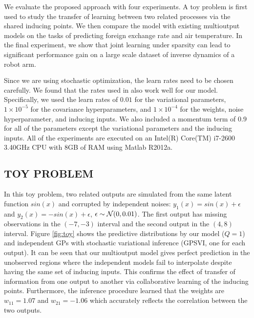 We evaluate the proposed approach with four experiments.
A toy problem is first used to study the transfer of learning between two related processes via the shared inducing points.
We then compare the model with existing multioutput models on the tasks of predicting foreign exchange rate and air temperature.
In the final experiment, we show that joint learning under sparsity can lead to significant performance gain on a large scale dataset of inverse dynamics of a robot arm. 

Since we are using stochastic optimization, the learn rates need to be chosen carefully.
We found that the rates used in \citet{hensmangaussian} also work well for our model.
Specifically, we used the learn rates of $0.01$ for the variational parameters, $1 \times 10^{-5}$ for the  covariance hyperparameters, and $1 \times 10^{-4}$ for the weights, noise hyperparameter, and inducing inputs.
We also included a momentum term of $0.9$ for all of the parameters except the variational parameters and the inducing inputs.
All of the experiments are executed on an Intel(R) Core(TM) i7-2600 3.40GHz CPU with 8GB of RAM using Matlab R2012a.

\subsection{TOY PROBLEM}
In this toy problem, two related outputs are simulated from the same latent function $sin(x)$ and corrupted by independent noises: $y_1(x) = sin(x) + \epsilon$ and $y_2(x) = -sin(x) + \epsilon$, $\epsilon \sim \mathcal{N}(0,0.01)$.
The first output has missing observations in the $(-7,-3)$ interval and the second output in the $(4,8)$ interval.
Figure \ref{fig:toy} shows the predictive distributions by our model ($Q = 1$) and independent GPs with stochastic variational inference (GPSVI, one for each output).
It can be seen that our multioutput model gives perfect prediction in the unobserved regions where the independent models fail to interpolate despite having the same set of inducing inputs.
This confirms the effect of transfer of information from one output to another via collaborative learning of the inducing points.
Furthermore, the inference procedure learned that the weights are $w_{11} = 1.07$ and $w_{21} = -1.06$ which accurately reflects the correlation between the two outputs.

